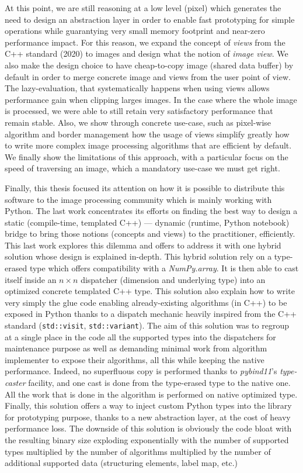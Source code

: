 At this point, we are still reasoning at a low level (pixel) which generates the need to design an abstraction layer in
order to enable fast prototyping for simple operations while guarantying very small memory footprint and near-zero
performance impact. For this reason, we expand the concept of \emph{views} from the C++ standard (2020) to images and
design what the notion of \emph{image view}. We also make the design choice to have cheap-to-copy image (shared data
buffer) by default in order to merge concrete image and views from the user point of view. The lazy-evaluation, that
systematically happens when using views allows performance gain when clipping larges images. In the case where the whole
image is processed, we were able to still retain very satisfactory performance that remain stable. Also, we show through
concrete use-case, such as pixel-wise algorithm and border management how the usage of views simplify greatly how to
write more complex image processing algorithms that are efficient by default. We finally show the limitations of this
approach, with a particular focus on the speed of traversing an image, which a mandatory use-case we must get right.

Finally, this thesis focused its attention on how it is possible to distribute this software to the image processing
community which is mainly working with Python. The last work concentrates its efforts on finding the best way to design
a static (compile-time, templated C++) --- dynamic (runtime, Python notebook) bridge to bring those notions (concepts
and views) to the practitioner, efficiently. This last work explores this dilemma and offers to address it with one
hybrid solution whose design is explained in-depth. This hybrid solution rely on a type-erased type which offers
compatibility with a \emph{NumPy.array}. It is then able to cast itself inside an \(n \times n\) dispatcher (dimension
and underlying type) into an optimized concrete templated C++ type. This solution also explain how to write very simply
the glue code enabling already-existing algorithms (in C++) to be exposed in Python thanks to a dispatch mechanic
heavily inspired from the C++ standard (\texttt{std::visit}, \texttt{std::variant}). The aim of this solution was to
regroup at a single place in the code all the supported types into the dispatchers for maintenance purpose as well as
demanding minimal work from algorithm implementer to expose their algorithms, all this while keeping the native
performance. Indeed, no superfluous copy is performed thanks to \emph{pybind11}'s \emph{type-caster} facility, and one
cast is done from the type-erased type to the native one. All the work that is done in the algorithm is performed on
native optimized type. Finally, this solution offers a way to inject custom Python types into the library for
prototyping purpose, thanks to a new abstraction layer, at the cost of heavy performance loss. The downside of this
solution is obviously the code bloat with the resulting binary size exploding exponentially with the number of supported
types multiplied by the number of algorithms multiplied by the number of additional supported data (structuring
elements, label map, etc.)

